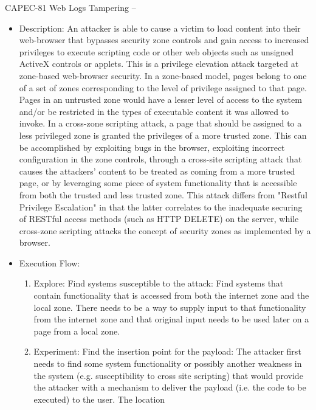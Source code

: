 \begin{example}	CAPEC-81\autocite{CAPEC-81} Web Logs Tampering --
	\begin{itemize}
		\item Description: An attacker is able to cause a victim to
			load content into their web-browser that bypasses
			security zone controls and gain access to increased
			privileges to execute scripting code or other web
			objects such as unsigned ActiveX controls or applets.
			This is a privilege elevation attack targeted at
			zone-based web-browser security. In a zone-based model,
			pages belong to one of a set of zones corresponding to
			the level of privilege assigned to that page. Pages in
			an untrusted zone would have a lesser level of access
			to the system and/or be restricted in the types of
			executable content it was allowed to invoke. In a
			cross-zone scripting attack, a page that should be
			assigned to a less privileged zone is granted the
			privileges of a more trusted zone. This can be
			accomplished by exploiting bugs in the browser,
			exploiting incorrect configuration in the zone
			controls, through a cross-site scripting attack that
			causes the attackers' content to be treated as coming
			from a more trusted page, or by leveraging some piece
			of system functionality that is accessible from both
			the trusted and less trusted zone. This attack differs
			from "Restful Privilege Escalation" in that the latter
			correlates to the inadequate securing of RESTful access
			methods (such as HTTP DELETE) on the server, while
			cross-zone scripting attacks the concept of security
			zones as implemented by a browser. 
		\item Execution Flow: 
			\begin{enumerate}
				\item Explore: Find systems susceptible to the
					attack: Find systems that contain
					functionality that is accessed from
					both the internet zone and the local
					zone. There needs to be a way to supply
					input to that functionality from the
					internet zone and that original input
					needs to be used later on a page from a
					local zone. 
				\item Experiment: Find the insertion point for
					the payload: The attacker first needs
					to find some system functionality or
					possibly another weakness in the system
					(e.g. susceptibility to cross site
					scripting) that would provide the
					attacker with a mechanism to deliver
					the payload (i.e. the code to be
					executed) to the user. The location

\end{enumerate}
\end{itemize}
\end{example}

